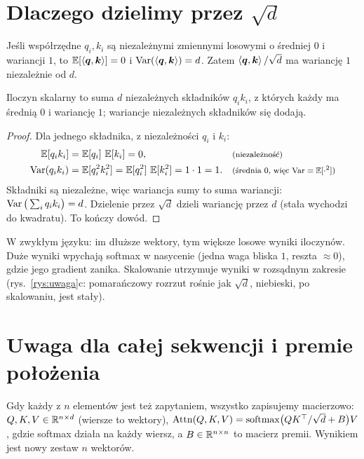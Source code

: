 \section{Dlaczego dzielimy przez $\sqrt{d}$}

\begin{twierdzenie}\label{tw:wariancja}
Jeśli współrzędne $q_i,k_i$ są niezależnymi zmiennymi losowymi o średniej $0$ i wariancji $1$, to $\operatorname{\mathbb{E}}[\left\langle \bm{q},\bm{k}\right\rangle]=0$ i $\operatorname{Var}(\left\langle \bm{q},\bm{k}\right\rangle)=d$.
Zatem $\left\langle \bm{q},\bm{k}\right\rangle/\sqrt d$ ma wariancję $1$ niezależnie od $d$.
\end{twierdzenie}
\begin{pomyslDowodu}
Iloczyn skalarny to suma $d$ niezależnych składników $q_ik_i$, z których każdy ma średnią $0$ i wariancję $1$; wariancje niezależnych składników się dodają.
\end{pomyslDowodu}
\begin{proof}
Dla jednego składnika, z niezależności $q_i$ i $k_i$:
\begin{align*}
\operatorname{\mathbb{E}}[q_ik_i] &= \operatorname{\mathbb{E}}[q_i]\,\operatorname{\mathbb{E}}[k_i]=0, && \text{\footnotesize (niezależność)}\\
\operatorname{Var}(q_ik_i) &= \operatorname{\mathbb{E}}[q_i^2k_i^2]=\operatorname{\mathbb{E}}[q_i^2]\,\operatorname{\mathbb{E}}[k_i^2]=1\cdot1=1. && \text{\footnotesize (średnia $0$, więc $\operatorname{Var}=\operatorname{\mathbb{E}}[\cdot^2]$)}
\end{align*}
Składniki są niezależne, więc wariancja sumy to suma wariancji: $\operatorname{Var}\big(\sum_iq_ik_i\big)=d$. Dzielenie przez $\sqrt d$ dzieli wariancję przez $d$ (stała wychodzi do kwadratu). To kończy dowód.
\end{proof}

W zwykłym języku: im dłuższe wektory, tym większe losowe wyniki iloczynów. Duże wyniki wpychają softmax w nasycenie (jedna waga bliska $1$, reszta $\approx0$), gdzie jego gradient zanika. Skalowanie utrzymuje wyniki w rozsądnym zakresie
(rys.~\ref{rys:uwaga}c: pomarańczowy rozrzut rośnie jak $\sqrt d$, niebieski, po skalowaniu, jest stały).

\section{Uwaga dla całej sekwencji i premie położenia}

Gdy każdy z $n$ elementów jest też zapytaniem, wszystko zapisujemy macierzowo: $Q,K,V\in\mathbb{R}^{n\times d}$ (wiersze to wektory), $\operatorname{Attn}(Q,K,V)=\operatorname{softmax}\!\big(QK^{\top}/\sqrt d+B\big)V$, gdzie softmax działa na każdy wiersz,
a $B\in\mathbb{R}^{n\times n}$ to macierz premii. Wynikiem jest nowy zestaw $n$ wektorów.

